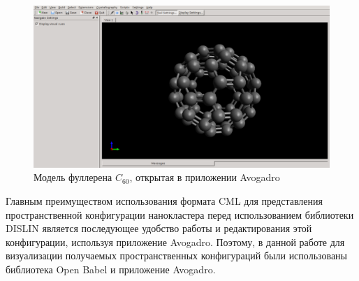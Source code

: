 \begin{figure}[ht!]
\centering
  \includegraphics[width=1.0\textwidth]{./FIGs/Avogadro_screenshot.pdf}
\caption{Модель фуллерена $C_{60}$, открытая в приложении Avogadro}
\label{Avogadro_screenshot}
\end{figure}

Главным преимуществом использования формата CML для представления пространственной
конфигурации нанокластера перед использованием библиотеки DISLIN является последующее
удобство работы и редактирования этой конфигурации, используя приложение Avogadro.
Поэтому, в данной работе для визуализации получаемых пространственных конфигураций
были использованы библиотека Open Babel и приложение Avogadro.
